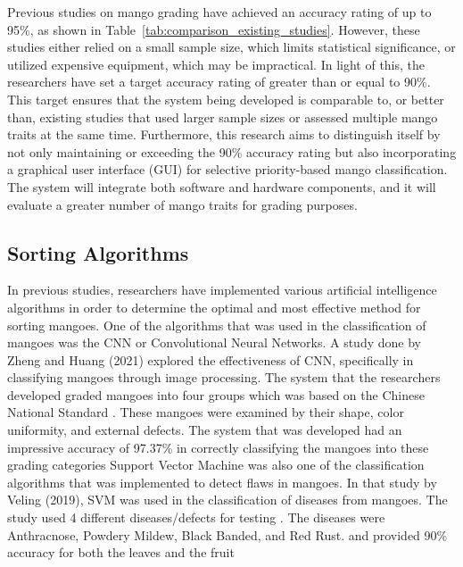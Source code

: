 Previous studies on mango grading have achieved an accuracy rating of up to 95\%, as
shown in Table~\ref{tab:comparison_existing_studies}. However, these studies either relied on a small sample size, which
limits statistical significance, or utilized expensive equipment, which may be
impractical. In light of this, the researchers have set a target accuracy rating of greater than or equal to 90\%.
This target ensures that the system being developed is comparable to, or better than,
existing studies that used larger sample sizes or assessed multiple mango traits at the
same time. Furthermore, this research aims to distinguish itself by not only maintaining
or exceeding the 90\% accuracy rating but also incorporating a graphical user interface
(GUI) for selective priority-based mango classification. The system will integrate both
software and hardware components, and it will evaluate a greater number of mango
traits for grading purposes.

\subsection{Sorting Algorithms}
In previous studies, researchers have implemented various artificial intelligence
algorithms in order to determine the optimal and most effective method for sorting
mangoes. One of the algorithms that was used in the classification of mangoes was the
CNN or Convolutional Neural Networks. A study done by Zheng and Huang (2021)
explored the effectiveness of CNN, specifically in classifying mangoes through image
processing. The system that the researchers developed graded mangoes into four groups
which was based on the Chinese National Standard \cite{zheng-mango-2021}. These mangoes were examined by
their shape, color uniformity, and external defects. The system that was developed had
an impressive accuracy of 97.37\% in correctly classifying the mangoes into these
grading categories
Support Vector Machine was also one of the classification algorithms that was
implemented to detect flaws in mangoes. In that study by Veling (2019), SVM
was used in the classification of diseases from mangoes. The study used 4 different
diseases/defects for testing \cite{veling-mango-2019}. The diseases were Anthracnose, Powdery Mildew, Black
Banded, and Red Rust. and provided 90\% accuracy for both the leaves and the fruit


